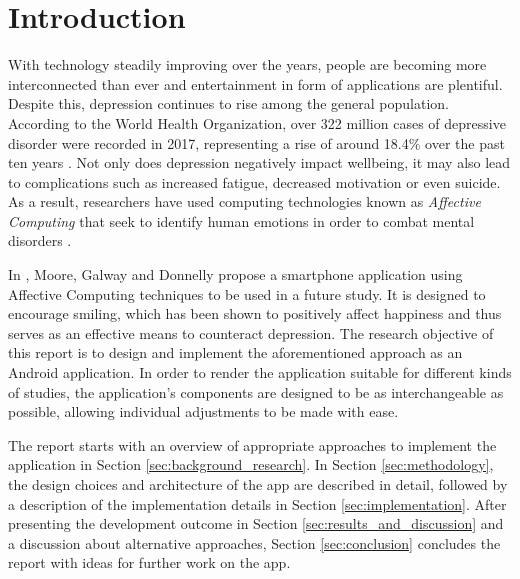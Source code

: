 \section{Introduction} \label{sec:introduction}
With technology steadily improving over the years, people are becoming more interconnected than ever and entertainment in form of applications are plentiful. Despite this, depression continues to rise among the general population.
According to the World Health Organization, over 322 million cases of depressive disorder were recorded in 2017, representing a rise of around 18.4\% over the past ten years \cite{who_depression}.
Not only does depression negatively impact wellbeing, it may also lead to complications such as increased fatigue, decreased motivation or even suicide.
As a result, researchers have used computing technologies known as \textit{Affective Computing} that seek to identify human emotions in order to combat mental disorders \cite{ieee_affective}.

In \cite{sohappy}, Moore, Galway and Donnelly propose a smartphone application using Affective Computing techniques to be used in a future study.
It is designed to encourage smiling, which has been shown to positively affect happiness and thus serves as an effective means to counteract depression.
The research objective of this report is to design and implement the aforementioned approach as an Android application.
In order to render the application suitable for different kinds of studies, the application's components are designed to be as interchangeable as possible, allowing individual adjustments to be made with ease.

The report starts with an overview of appropriate approaches to implement the application in Section \ref{sec:background_research}.
In Section \ref{sec:methodology}, the design choices and architecture of the app are described in detail, followed by a description of the implementation details in Section \ref{sec:implementation}.
After presenting the development outcome in Section \ref{sec:results_and_discussion} and a discussion about alternative approaches, Section \ref{sec:conclusion} concludes the report with ideas for further work on the app.

